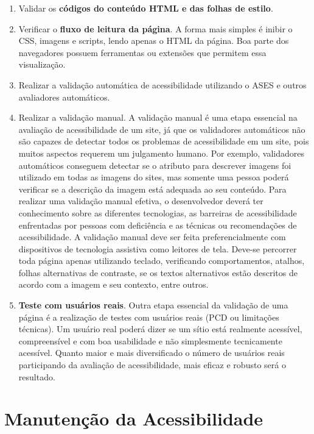 \documentclass[
  12pt,
  openright,
  twoside,
  a4paper,
  english,
  french,
  spanish,
  brazil
]{abntex2}
\begin{document}
\begin{enumerate}
  \item Validar os \textbf{códigos do conteúdo HTML e das folhas de estilo}.
  \item
    Verificar o \textbf{fluxo de leitura da página}. A forma mais simples é
    inibir o CSS, imagens e scripts, lendo apenas o HTML da página. Boa
    parte dos navegadores possuem ferramentas ou extensões que permitem essa
    visualização.
  \item
    Realizar a validação automática de acessibilidade utilizando o ASES e outros
    avaliadores automáticos.
  \item
    Realizar a validação manual. A validação manual é uma etapa essencial na
    avaliação de acessibilidade de um site, já que os validadores automáticos
    não são capazes de detectar todos os problemas de acessibilidade em um site,
    pois muitos aspectos requerem um julgamento humano. Por exemplo, validadores
    automáticos conseguem detectar se o atributo para descrever imagens foi
    utilizado em todas as imagens do sites, mas somente uma pessoa poderá
    verificar se a descrição da imagem está adequada ao seu conteúdo. Para
    realizar uma validação manual efetiva, o desenvolvedor deverá ter
    conhecimento sobre as diferentes tecnologias, as barreiras de acessibilidade
    enfrentadas por pessoas com deficiência e as técnicas ou recomendações de
    acessibilidade. A validação manual deve ser feita preferencialmente com
    dispositivos de tecnologia assistiva como leitores de tela. Deve-se
    percorrer toda página apenas utilizando teclado, verificando comportamentos,
    atalhos, folhas alternativas de contraste, se os textos alternativos estão
    descritos de acordo com a imagem e seu contexto, entre outros.
  \item
    \textbf{Teste com usuários reais}. Outra etapa essencial da validação de uma
    página é a realização de testes com usuários reais (PCD ou limitações
    técnicas). Um usuário real poderá dizer se um sítio está realmente
    acessível, compreensível e com boa usabilidade e não simplesmente
    tecnicamente acessível. Quanto maior e mais diversificado o número de
    usuários reais participando da avaliação de acessibilidade, mais eficaz e
    robusto será o resultado.
\end{enumerate}

\section{Manutenção da Acessibilidade}
\end{document}
